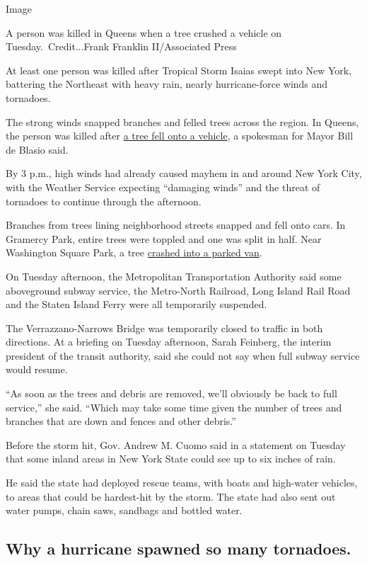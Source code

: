 Image

A person was killed in Queens when a tree crushed a vehicle on
Tuesday.~Credit...Frank Franklin II/Associated Press

At least one person was killed after Tropical Storm Isaias swept into
New York, battering the Northeast with heavy rain, nearly
hurricane-force winds and tornadoes.

The strong winds snapped branches and felled trees across the region. In
Queens, the person was killed after
\href{https://1010wins.radio.com/articles/tree-falls-onto-parked-vehicle-in-queens-killing-1-person}{a
tree fell onto a vehicle}, a spokesman for Mayor Bill de Blasio said.

By 3 p.m., high winds had already caused mayhem in and around New York
City, with the Weather Service expecting ``damaging winds'' and the
threat of tornadoes to continue through the afternoon.

Branches from trees lining neighborhood streets snapped and fell onto
cars. In Gramercy Park, entire trees were toppled and one was split in
half. Near Washington Square Park, a tree
\href{https://twitter.com/michelledozois/status/1290733797344935936}{crashed
into a parked van}.

On Tuesday afternoon, the Metropolitan Transportation Authority said
some aboveground subway service, the Metro-North Railroad, Long Island
Rail Road and the Staten Island Ferry were all temporarily suspended.

The Verrazzano-Narrows Bridge was temporarily closed to traffic in both
directions. At a briefing on Tuesday afternoon, Sarah Feinberg, the
interim president of the transit authority, said she could not say when
full subway service would resume.

``As soon as the trees and debris are removed, we'll obviously be back
to full service,'' she said. ``Which may take some time given the number
of trees and branches that are down and fences and other debris.''

Before the storm hit, Gov. Andrew M. Cuomo said in a statement on
Tuesday that some inland areas in New York State could see up to six
inches of rain.

He said the state had deployed rescue teams, with boats and high-water
vehicles, to areas that could be hardest-hit by the storm. The state had
also sent out water pumps, chain saws, sandbags and bottled water.

\hypertarget{why-a-hurricane-spawned-so-many-tornadoes}{%
\subsection{Why a hurricane spawned so many
tornadoes.}\label{why-a-hurricane-spawned-so-many-tornadoes}}


